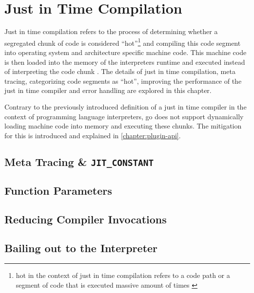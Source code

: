 \chapter{Just in Time Compilation}

Just in time compilation refers to the process of determining whether a
segregated chunk of code is considered ``hot''\footnote{hot in the context of
just in time compilation refers to a code path or a segment of code that is
executed massive amount of times \cite{jvm_ibm_optlevel, jvm_efficient}} and
compiling this code segment into operating system and architecture specific
machine code. This machine code is then loaded into the memory of the
interpreters runtime and executed instead of interpreting the code chunk
\cite{jvm_efficient}. The details of just in time compilation, meta tracing,
categorizing code segments as ``hot'', improving the performance of the just in
time compiler and error handling are explored in this chapter.

Contrary to the previously introduced definition of a just in time
compiler in the context of programming language interpreters, go does
not support dynamically loading machine code into memory and executing
these chunks. The mitigation for this is introduced and explained in
\autoref{chapter:plugin-api}.

\section{Meta Tracing \& \texttt{JIT\_CONSTANT}}


\section{Function Parameters}


\section{Reducing Compiler Invocations}


\section{Bailing out to the Interpreter}


